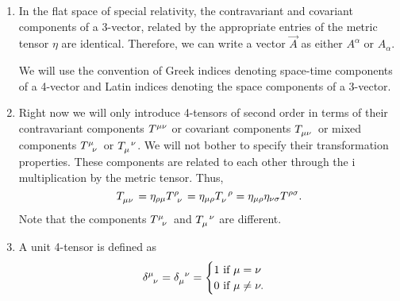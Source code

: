 \begin{enumerate}
\item In the flat space of special relativity, the contravariant and
covariant components of a 3-vector, related by the appropriate entries of the
metric tensor $\eta$ are identical. Therefore, we can write a vector $\vec{A}$ 
as either $A^\alpha$ or $A_\alpha$.

We will use the convention of Greek indices denoting space-time components of 
a 4-vector and Latin indices denoting the space components of a 3-vector.

\item Right now we will only introduce 4-tensors of second order in terms of 
their contravariant components $\tensor{T}{^{\mu\nu}}$ or covariant components 
$\tensor{T}{_{\mu\nu}}$ or mixed components $\tensor{T}{^\mu_\nu}$ or 
$\tensor{T}{_\mu^\nu} $. We will not bother to specify their transformation 
properties. These components are related to each other through the i
multiplication by the metric tensor. Thus, 
\begin{equation}\label{c1e50}
\tensor{T}{_{\mu\nu}} = \eta_{\rho\mu}\tensor{T}{^\rho_\nu} =
\eta_{\mu\rho}\tensor{T}{_\nu^\rho} = 
\eta_{\mu\rho}\eta_{\nu\sigma}T^{\rho\sigma}.
\end{equation}
Note that the components $\tensor{T}{^\mu_\nu}$ and $\tensor{T}{_\mu^\nu}$ are 
different.

\item A unit 4-tensor is defined as
\begin{equation}\label{c1e51}
\tensor{\delta}{^\mu_\nu} = \tensor{\delta}{_\mu^\nu} = \begin{cases}
1 \text{  if  } \mu = \nu \\
0 \text{  if  } \mu \ne \nu.
\end{cases}
\end{equation}


\end{enumerate}
